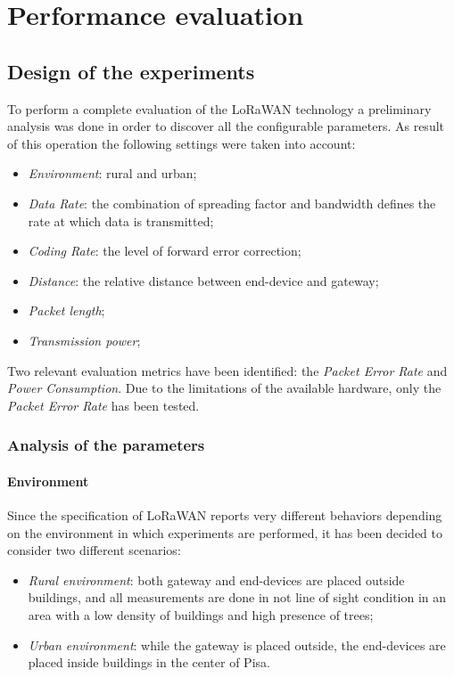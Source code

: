 \chapter{Performance evaluation}
\label{chap:experiments}

\section{Design of the experiments}

To perform a complete evaluation of the LoRaWAN technology a preliminary analysis was done in order to discover all the configurable parameters. As result of this operation the following settings were taken into account:
\begin{itemize}
\item \emph{Environment}: rural and urban;
\item \emph{Data Rate}: the combination of spreading factor and bandwidth defines the rate at which data is transmitted;
\item \emph{Coding Rate}: the level of forward error correction;
\item \emph{Distance}: the relative distance between end-device and gateway;
\item \emph{Packet length};
\item \emph{Transmission power};
\end{itemize}
Two relevant evaluation metrics have been identified: the  \emph{Packet Error Rate} and \emph{Power Consumption}. Due to the limitations of the available hardware, only the \emph{Packet Error Rate} has been tested. 


\subsection{Analysis of the parameters}

\subsubsection{Environment}
Since the specification of LoRaWAN reports very different behaviors depending on the environment in which experiments are performed, it has been decided to consider two different scenarios:
\begin{itemize}
\item \emph{Rural environment}: both gateway and end-devices are placed outside buildings, and all measurements are done in not line of sight condition in an area with a low density of buildings and high presence of trees;

\item \emph{Urban environment}: while the gateway is placed outside, the end-devices are placed inside buildings in the center of Pisa.
\end{itemize}


